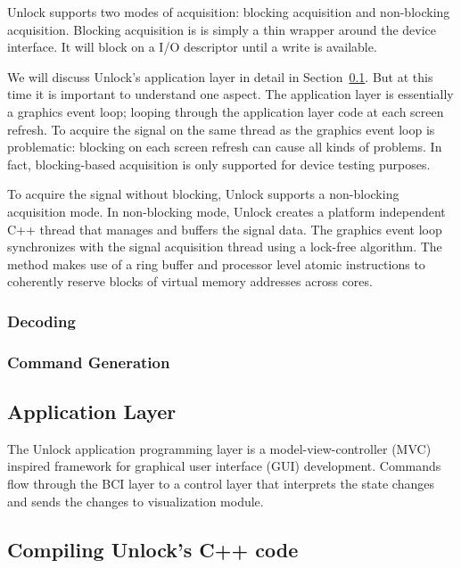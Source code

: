 \documentclass[11pt]{article}
\begin{document}
Unlock supports two modes of acquisition: blocking acquisition and non-blocking acquisition.  Blocking acquisition is is simply a thin wrapper around the device interface.  It will block on a I/O descriptor until a write is available.

We will discuss Unlock's application layer in detail in Section~\ref{applicationsec}.  But at this time it is important to understand one aspect.  The application layer is essentially a graphics event loop; looping through the application layer code at each screen refresh.  To acquire the signal on the same thread as the graphics event loop is problematic: blocking on each screen refresh can cause all kinds of problems.  In fact, blocking-based acquisition is only supported for device testing purposes. 

To acquire the signal without blocking, Unlock supports a non-blocking acquisition mode.  In non-blocking mode, Unlock creates a platform independent C++ thread that manages and buffers the signal data.  The graphics event loop synchronizes with the signal acquisition thread using a lock-free algorithm.  The method makes use of a ring buffer and processor level atomic instructions to coherently reserve blocks of virtual memory addresses across cores.

\subsubsection{Decoding}

\subsubsection{Command Generation}

\subsection{Application Layer}\label{applicationsec}

The Unlock application programming layer is a model-view-controller (MVC)~\cite{mvc, mvc2} inspired framework for graphical user interface (GUI) development.  Commands flow through the BCI layer to a control layer that interprets the state changes and sends the changes to visualization module.

\subsection{Compiling Unlock's C++ code}
\end{document}
